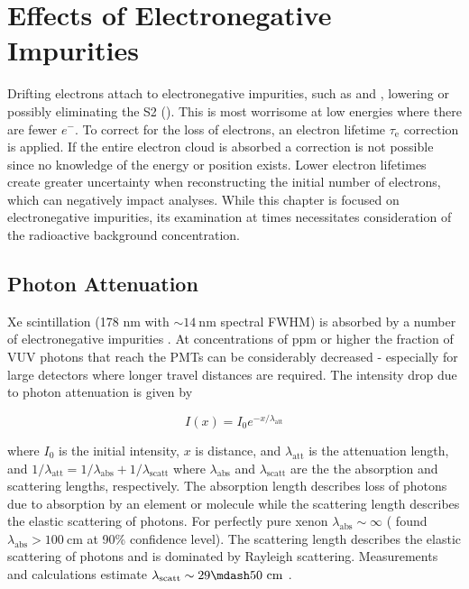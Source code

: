 \section{Effects of Electronegative Impurities}
\label{sec:importance_procedure_effects}
Drifting electrons attach to electronegative impurities, such as  and , lowering or possibly eliminating the S2
().  This
is most worrisome at low energies
where there are fewer $e^-$.  To correct for the loss of electrons, an electron lifetime
$\tau_{\mathrm{e}}$ correction is applied.  If the entire electron cloud is
absorbed a correction is not possible since no knowledge of the energy or position exists.  Lower electron lifetimes create greater
uncertainty when reconstructing the initial number of electrons, which can negatively impact
analyses.  While this
chapter is focused on electronegative impurities, its examination at times necessitates consideration of the radioactive background
concentration.

\subsection{Photon Attenuation}
\label{subsec:importance_procedure_effects_photons}
Xe scintillation (178 nm with ${\sim} 14\ \mathrm{nm}$ spectral FWHM) is absorbed by a number of electronegative impurities
.  At concentrations of ppm or higher
the fraction of VUV photons that reach the PMTs can be considerably decreased - especially for large detectors where longer travel
distances are required.  The intensity drop due to photon attenuation is given by

\vspace{-10pt}

\begin{equation}
I(x) = I_0 e^{-x / \lambda_{\mathrm{att}}}
\end{equation}

\noindent where $I_0$ is the initial intensity, $x$ is distance, and $\lambda_{\mathrm{att}}$ is the attenuation length, and
$1 / \lambda_{\mathrm{att}} = 1 / \lambda_{\mathrm{abs}} + 1 / \lambda_{\mathrm{scatt}}$ where $\lambda_{\mathrm{abs}}$ and
$\lambda_{\mathrm{scatt}}$ are the the absorption and scattering lengths, respectively.  The absorption length describes loss of
photons due to absorption by an element or molecule while the scattering length describes the elastic scattering of photons.  For
perfectly pure xenon
$\lambda_{\mathrm{abs}} \sim \infty$ ( found $\lambda_{\mathrm{abs}} > 100\ \mathrm{cm}$ at 90\% confidence
level).  The scattering length describes the elastic scattering of photons and is dominated by Rayleigh scattering.  Measurements and
calculations estimate $\lambda_{\mathrm{scatt}} \sim 29 \mdash 50\ \mathrm{cm}$ .

